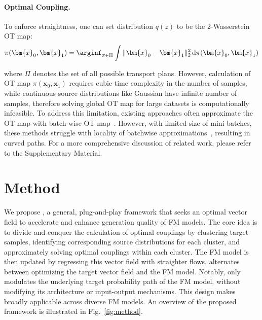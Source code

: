 \paragraph{Optimal Coupling.}
To enforce straightness, one can set distribution $q(z)$ to be the 2-Wasserstein OT map:
\begin{align}
    \pi(\bm{x}_0, \bm{x}_1) = \arginf_{\pi \in \Pi} \int \|\bm{x}_0 - \bm{x}_1\|_2^2 \, \mathrm{d} \pi(\bm{x}_0, \bm{x}_1)
    \label{eqn:ot}
\end{align}

where $\Pi$ denotes the set of all possible transport plans.  However, calculation of OT map $\pi(\bm{x}_0, \bm{x}_1)$ requires cubic time complexity in the number of samples, while continuous source distributions like Gaussian have infinite number of samples, therefore solving global OT map for large datasets is computationally infeasible.  To address this limitation, existing approaches often approximate the OT map with batch-wise OT map~\cite{fatras2021minibatchoptimaltransportdistances, nguyen2022improvingminibatchoptimaltransport, pooladian2023multisample,kornilov2024optimal, haxholli2024minibatchoptimaltransportperplexity,davtyan2025faster,lin2025beyond, cheng2025curse}.  However, with limited size of mini-batches, these methods struggle with locality of batchwise approximations~\cite{fatras2021unbalanced}, resulting in curved paths. For a more comprehensive discussion of related work, please refer to the Supplementary Material.
\section{Method}
\label{sec:method}

We propose \method{}, a general, plug-and-play framework that seeks an optimal vector field to accelerate and enhance generation quality of FM models.  The core idea is to divide-and-conquer the calculation of optimal couplings by clustering target samples, identifying corresponding source distributions for each cluster, and approximately solving optimal couplings within each cluster.  The FM model is then updated by regressing this vector field with straighter flows.  \method{} alternates between optimizing the target vector field and the FM model.  Notably, \method{} only modulates the underlying target probability path of the FM model, without modifying its architecture or input-output mechanisms.  This design makes \method{} broadly applicable across diverse FM models.  An overview of the proposed framework is illustrated in Fig.~\ref{fig:method}.


